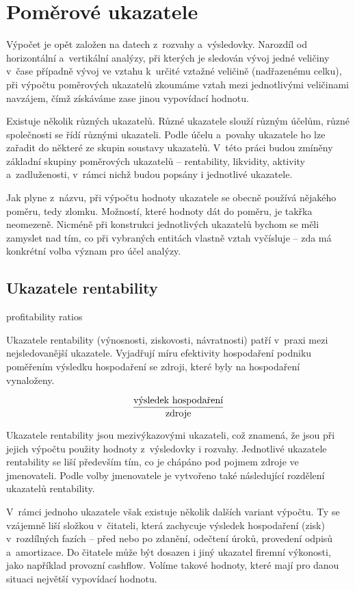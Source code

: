 \section{Poměrové ukazatele}
Výpočet je opět založen na datech z~rozvahy a~výsledovky. Narozdíl od horizontální a~vertikální analýzy, při kterých je sledován vývoj jedné veličiny v~čase případně vývoj ve vztahu k~určité vztažné veličině (nadřazenému celku), při výpočtu poměrových ukazatelů zkoumáme vztah mezi jednotlivými veličinami navzájem, čímž získáváme zase jinou vypovídací hodnotu.

Existuje několik různých ukazatelů. Různé ukazatele slouží různým účelům, různé společnosti se řídí různými ukazateli. Podle účelu a~povahy ukazatele ho lze zařadit do některé ze skupin soustavy ukazatelů. V~této práci budou zmíněny základní skupiny poměrových ukazatelů -- rentability, likvidity, aktivity a~zadluženosti, v~rámci nichž budou popsány i jednotlivé ukazatele.

Jak plyne z~názvu, při výpočtu hodnoty ukazatele se obecně používá nějakého poměru, tedy zlomku. Možností, které hodnoty dát do poměru, je takřka neomezeně. Nicméně při konstrukci jednotlivých ukazatelů bychom se měli zamyslet nad tím, co při vybraných entitách vlastně vztah vyčísluje -- zda má konkrétní volba význam pro účel analýzy\cite{kisling}.

\pagebreak
\subsection{Ukazatele rentability}
profitability ratios

Ukazatele rentability (výnosnosti, ziskovosti, návratnosti) patří v~praxi mezi nejsledovanější ukazatele. Vyjadřují míru efektivity hospodaření podniku poměřením výsledku hospodaření se zdroji, které byly na hospodaření vynaloženy.

$$\dfrac{\text{výsledek hospodaření}}{\text{zdroje}}$$

Ukazatele rentability jsou mezivýkazovými ukazateli, což znamená, že jsou při jejich výpočtu použity hodnoty z~výsledovky i rozvahy. Jednotlivé ukazatele rentability se liší především tím, co je chápáno pod pojmem zdroje ve jmenovateli\cite{mendelu}. Podle volby jmenovatele je vytvořeno také následující rozdělení ukazatelů rentability. 

V~rámci jednoho ukazatele však existuje několik dalších variant výpočtu. Ty se vzájemně liší složkou v~čitateli, která zachycuje výsledek hospodaření (zisk) v~rozdílných fazích -- před nebo po zdanění, odečtení úroků, provedení odpisů a~amortizace. Do čitatele může být dosazen i jiný ukazatel firemní výkonosti, jako například provozní cashflow. Volíme takové hodnoty, které mají pro danou situaci největší vypovídací hodnotu.

